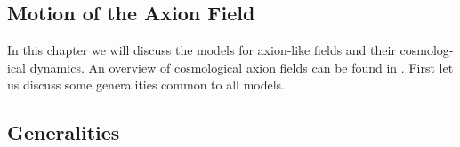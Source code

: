 \documentclass[master,       %
               twoside,        %
               BCOR10mm,       %
               english,ngerman, %
               ]{GAUBM}
\begin{document}
\begin{otherlanguage}{english}



\chapter{Motion of the Axion Field}
\label{sec:motion_of_the_axion_field}

In this chapter we will discuss the models for axion-like fields and their cosmological dynamics.
An overview of cosmological axion fields can be found in \cite{MarshAxionCosmo}.
First let us discuss some generalities common to all models.


\section{Generalities}


\end{otherlanguage}
\end{document}
